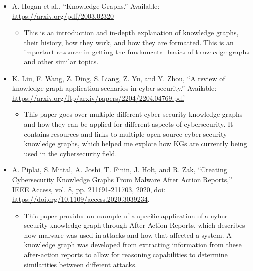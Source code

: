 \documentclass[12pt, a4paper]{article}
\begin{document}
        
    \begin{itemize}
        \item A. Hogan et al., “Knowledge Graphs.” Available: \url{https://arxiv.org/pdf/2003.02320}
        \begin{itemize}
            \item This is an introduction and in-depth explanation of knowledge graphs, their history, how they work, and how they are formatted. 
            This is an important resource in getting the fundamental basics of knowledge graphs and other similar topics. 
        \end{itemize}
    \end{itemize}
    \begin{itemize}
        \item K. Liu, F. Wang, Z. Ding, S. Liang, Z. Yu, and Y. Zhou, “A review of knowledge graph application scenarios in cyber security.” 
        Available: \url{https://arxiv.org/ftp/arxiv/papers/2204/2204.04769.pdf}
        \begin{itemize}
            \item This paper goes over multiple different cyber security knowledge graphs and how they can be applied for different aspects of cybersecurity. 
            It contains resources and links to multiple open-source cyber security knowledge graphs, 
            which helped me explore how KGs are currently being used in the cybersecurity field. 
        \end{itemize}
    \end{itemize}
    \begin{itemize}
        \item A. Piplai, S. Mittal, A. Joshi, T. Finin, J. Holt, and R. Zak, “Creating Cybersecurity Knowledge Graphs From Malware After Action Reports,” 
        IEEE Access, vol. 8, pp. 211691-211703, 2020, doi: \url{https://doi.org/10.1109/access.2020.3039234}.
        \begin{itemize}
            \item This paper provides an example of a specific application of a cyber security knowledge graph through After Action Reports, 
            which describes how malware was used in attacks and how that affected a system. 
            A knowledge graph was developed from extracting information from these after-action reports to allow for reasoning capabilities 
            to determine similarities between different attacks. 
        \end{itemize}
    \end{itemize}
\end{document}
